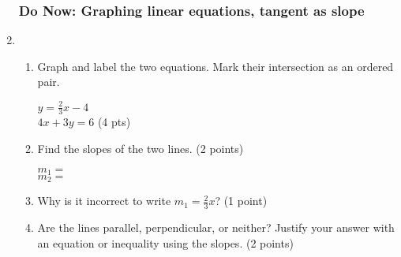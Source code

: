\documentclass[12pt, twoside]{article}
\begin{document}
\begin{enumerate}
    \subsubsection*{Do Now: Graphing linear equations, tangent as slope}
    
    \item \begin{enumerate}
        \item Graph and label the two equations. Mark their intersection as an ordered pair.
          \begin{multicols}{2}
            $y =\frac{2}{3}x-4$ \\
            $4x+3y=6$ \hfill (4 pts)
          \end{multicols}     \vspace{1cm}
        \item Find the slopes of the two lines. \hfill (2 points)
          \begin{multicols}{2}
            $m_1=$ \\
            $m_2=$
          \end{multicols}
        \item Why is it incorrect to write $m_1=\frac{2}{3}x$? \hfill (1 point) \vspace{2cm}
        \item Are the lines parallel, perpendicular, or neither? Justify your answer with an equation or inequality using the slopes. \hfill (2 points)
        \vspace{2cm}
      \end{enumerate}
        \begin{center}
        \end{center}
    

\end{enumerate}
\end{document}
